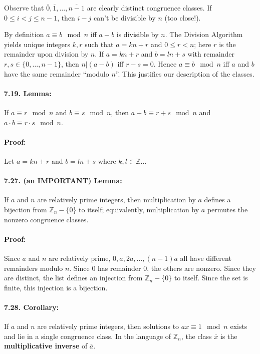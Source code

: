 \documentclass[a4paper, 11pt, twoside]{article}
\begin{document}
Observe that $\overline{0}, \overline{1},\dots, \overline{n-1}$ are clearly distinct congruence classes. If $0\leq i<j\leq n-1$, then $i-j$ can't be divisible by $n$ (too close!).

By definition $a\equiv b\mod n$ iff $a-b$ is divisible by $n$. The Division Algorithm yields unique integers $k,r$ such that $a=kn+r$ and $0\leq r<n$; here $r$ is the remainder upon division by $n$. If $a=kn+r$ and $b=ln+s$ with remainder $r, s\in\{0,\dots, n-1\}$, then $n|(a-b)$ iff $r-s=0$. Hence $a\equiv b\mod n$ iff $a$ and $b$ have the same remainder ``modulo $n$''. This justifies our description of the classes.

\paragraph{7.19. Lemma:} If $a\equiv r\mod n$ and $b\equiv s\mod n$, then $a+b\equiv r+s \mod n$ and $a\cdot b\equiv r\cdot s \mod n$.

\paragraph{Proof:} Let $a=kn+r$ and $b=ln+s$ where $k,l\in\mathbb{Z}\dots$

\paragraph{7.27. (an IMPORTANT) Lemma:} If $a$ and $n$ are relatively prime integers, then multiplication by $a$ defines a bijection from $\mathbb{Z}_n-\{0\}$ to itself; equivalently, multiplication by $a$ permutes the nonzero congruence classes.

\paragraph{Proof:} Since $a$ and $n$ are relatively prime, $0,a,2a,\dots, (n-1)a$ all have different remainders modulo $n$. Since $0$ has remainder $0$, the others are nonzero. Since they are distinct, the list defines an injection from $\mathbb{Z}_n -\{0\}$ to itself. Since the set is finite, this injection is a bijection.

\paragraph{7.28. Corollary:} If $a$ and $n$ are relatively prime integers, then solutions to $ax\equiv 1\mod n$ exists and lie in a single congruence class. In the language of $\mathbb{Z}_n$, the class $\overline{x}$ is the \textbf{multiplicative inverse} of $\overline{a}$.
\end{document}
